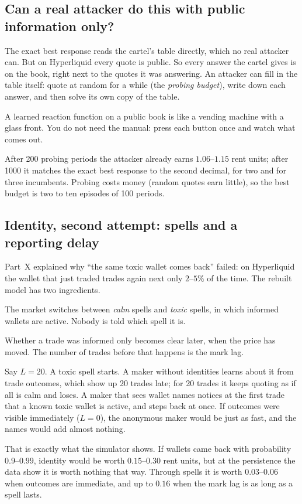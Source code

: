 \documentclass[11pt]{article}
\begin{document}
\subsection{Can a real attacker do this with public information only?}
The exact best response reads the cartel's table directly, which no real attacker can. But on
Hyperliquid every quote is public. So every answer the cartel gives is on the book, right next to the
quotes it was answering. An attacker can fill in the table itself: quote at random for a while (the
\emph{probing budget}), write down each answer, and then solve its own copy of the table.
\begin{intuition}
A learned reaction function on a public book is like a vending machine with a glass front. You do not
need the manual: press each button once and watch what comes out.
\end{intuition}
After 200 probing periods the attacker already earns $1.06$--$1.15$ rent units; after 1000 it matches
the exact best response to the second decimal, for two and for three incumbents. Probing costs money
(random quotes earn little), so the best budget is two to ten episodes of 100 periods.

\subsection{Identity, second attempt: spells and a reporting delay}
Part~X explained why ``the same toxic wallet comes back'' failed: on Hyperliquid the wallet that just
traded trades again next only $2$--$5\%$ of the time. The rebuilt model has two ingredients.
\begin{description}[style=sameline,leftmargin=0pt,itemsep=3pt]
\item[Regime] The market switches between \emph{calm} spells and \emph{toxic} spells, in which informed
wallets are active. Nobody is told which spell it is.
\item[Mark lag $L$] Whether a trade was informed only becomes clear later, when the price has moved. The
number of trades before that happens is the mark lag.
\end{description}
\begin{example}
Say $L=20$. A toxic spell starts. A maker without identities learns about it from trade outcomes,
which show up 20 trades late; for 20 trades it keeps quoting as if all is calm and loses. A maker that
sees wallet names notices at the first trade that a known toxic wallet is active, and steps back at
once. If outcomes were visible immediately ($L=0$), the anonymous maker would be just as fast, and the
names would add almost nothing.
\end{example}
That is exactly what the simulator shows. If wallets came back with probability $0.9$--$0.99$, identity
would be worth $0.15$--$0.30$ rent units, but at the persistence the data show it is worth nothing that
way. Through spells it is worth $0.03$--$0.06$ when outcomes are immediate, and up to $0.16$ when the
mark lag is as long as a spell lasts.
\end{document}
